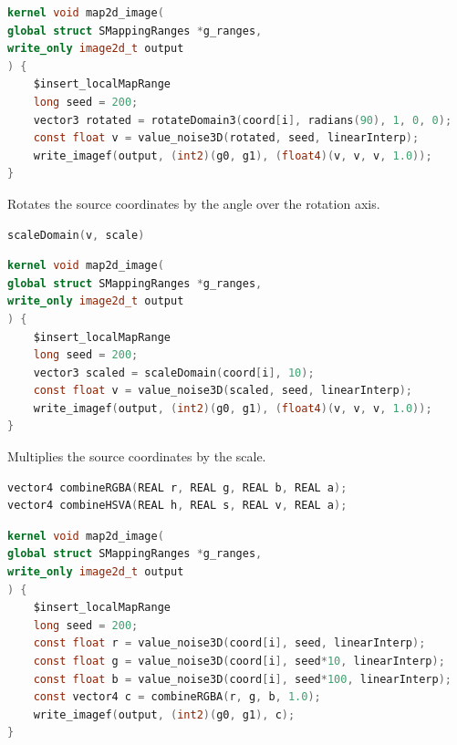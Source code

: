 \begin{lstlisting}[caption={Example for rotate domain functions},label={lst:rotate_domain_example},language=OpenCL]
kernel void map2d_image(
global struct SMappingRanges *g_ranges,
write_only image2d_t output
) {
    $insert_localMapRange
    long seed = 200;
    vector3 rotated = rotateDomain3(coord[i], radians(90), 1, 0, 0);
    const float v = value_noise3D(rotated, seed, linearInterp);
    write_imagef(output, (int2)(g0, g1), (float4)(v, v, v, 1.0));
}
\end{lstlisting}

Rotates the source coordinates by the angle over the rotation axis.

\begin{lstlisting}[caption={Definition of scale domain function},label={lst:scale_domain_definition},language=OpenCL]
scaleDomain(v, scale)
\end{lstlisting}

\begin{lstlisting}[caption={Example for scale domain function},label={lst:scale_domain_example},language=OpenCL]
kernel void map2d_image(
global struct SMappingRanges *g_ranges,
write_only image2d_t output
) {
    $insert_localMapRange
    long seed = 200;
    vector3 scaled = scaleDomain(coord[i], 10);
    const float v = value_noise3D(scaled, seed, linearInterp);
    write_imagef(output, (int2)(g0, g1), (float4)(v, v, v, 1.0));
}
\end{lstlisting}

Multiplies the source coordinates by the scale.

\begin{lstlisting}[caption={Definition of combine color values functions},label={lst:combine_color_definition},language=OpenCL]
vector4 combineRGBA(REAL r, REAL g, REAL b, REAL a);
vector4 combineHSVA(REAL h, REAL s, REAL v, REAL a);
\end{lstlisting}

\begin{lstlisting}[caption={Example for scale domain function},label={lst:combine_color_example},language=OpenCL]
kernel void map2d_image(
global struct SMappingRanges *g_ranges,
write_only image2d_t output
) {
    $insert_localMapRange
    long seed = 200;
    const float r = value_noise3D(coord[i], seed, linearInterp);
    const float g = value_noise3D(coord[i], seed*10, linearInterp);
    const float b = value_noise3D(coord[i], seed*100, linearInterp);
    const vector4 c = combineRGBA(r, g, b, 1.0);
    write_imagef(output, (int2)(g0, g1), c);
}
\end{lstlisting}

